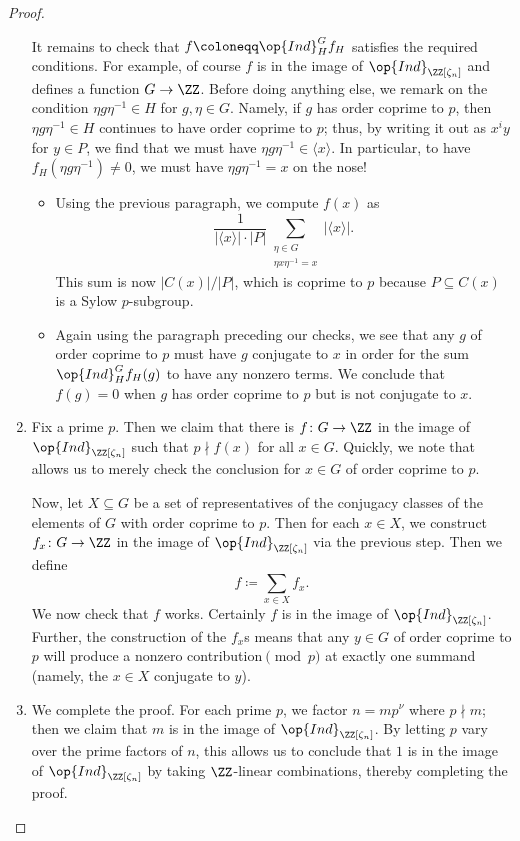 \documentclass[../thesis.tex]{subfiles}
\begin{document}
\begin{proof}
\begin{enumerate}
		It remains to check that $f\coloneqq\op{Ind}_H^Gf_H$ satisfies the required conditions. For example, of course $f$ is in the image of $\op{Ind}_{\ZZ[\zeta_n]}$ and defines a function $G\to\ZZ$. Before doing anything else, we remark on the condition $\eta g\eta^{-1}\in H$ for $g,\eta\in G$. Namely, if $g$ has order coprime to $p$, then $\eta g\eta^{-1}\in H$ continues to have order coprime to $p$; thus, by writing it out as $x^iy$ for $y\in P$, we find that we must have $\eta g\eta^{-1}\in\langle x\rangle$. In particular, to have $f_H\left(\eta g\eta^{-1}\right)\ne0$, we must have $\eta g\eta^{-1}=x$ on the nose!
		\begin{itemize}
			\item Using the previous paragraph, we compute $f(x)$ as
			\[\frac1{\left|\langle x\rangle\right|\cdot\left|P\right|}\sum_{\substack{\eta\in G\\\eta x\eta^{-1}=x}}\left|\langle x\rangle\right|.\]
			This sum is now $\left|C(x)\right|/\left|P\right|$, which is coprime to $p$ because $P\subseteq C(x)$ is a Sylow $p$-subgroup.
			\item Again using the paragraph preceding our checks, we see that any $g$ of order coprime to $p$ must have $g$ conjugate to $x$ in order for the sum $\op{Ind}_H^Gf_H(g)$ to have any nonzero terms. We conclude that $f(g)=0$ when $g$ has order coprime to $p$ but is not conjugate to $x$.
		\end{itemize}

		\item Fix a prime $p$. Then we claim that there is $f\colon G\to\ZZ$ in the image of $\op{Ind}_{\ZZ[\zeta_n]}$ such that $p\nmid f(x)$ for all $x\in G$. Quickly, we note that  allows us to merely check the conclusion for $x\in G$ of order coprime to $p$.

		Now, let $X\subseteq G$ be a set of representatives of the conjugacy classes of the elements of $G$ with order coprime to $p$. Then for each $x\in X$, we construct $f_x\colon G\to\ZZ$ in the image of $\op{Ind}_{\ZZ[\zeta_n]}$ via the previous step. Then we define
		\[f\coloneqq\sum_{x\in X}f_x.\]
		We now check that $f$ works. Certainly $f$ is in the image of $\op{Ind}_{\ZZ[\zeta_n]}$. Further, the construction of the $f_x$s means that any $y\in G$ of order coprime to $p$ will produce a nonzero contribution$\pmod p$ at exactly one summand (namely, the $x\in X$ conjugate to $y$).

		\item We complete the proof. For each prime $p$, we factor $n=mp^\nu$ where $p\nmid m$; then we claim that $m$ is in the image of $\op{Ind}_{\ZZ[\zeta_n]}$. By letting $p$ vary over the prime factors of $n$, this allows us to conclude that $1$ is in the image of $\op{Ind}_{\ZZ[\zeta_n]}$ by taking $\ZZ$-linear combinations, thereby completing the proof.


\end{enumerate}
\end{proof}
\end{document}
